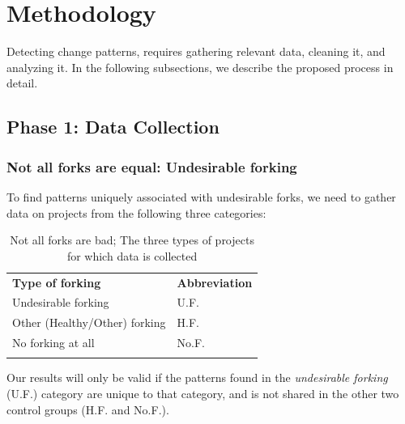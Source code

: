 \documentclass[11pt]{report}
\begin{document}
\section{Methodology}
\label{methodology}

Detecting change patterns, requires gathering  relevant data, cleaning it, and analyzing it. In the following subsections, we describe the proposed process in detail. 

\subsection{Phase 1: Data Collection}

\subsubsection{Not all forks are equal: Undesirable forking}
To find patterns uniquely associated with undesirable forks, we need to gather data on projects from the following three categories: 

\begin{table}[!htbp]
\caption{Not all forks are bad; The three types of projects for which data is collected}
\label{tableUndesirableForkingDataCollect} 
\begin{tabular}{p{} p{}}
\hline\noalign{\smallskip}
\textbf{Type of forking} & \textbf{Abbreviation} \\
\noalign{\smallskip}\hline\noalign{\smallskip}
Undesirable forking & U.F. \\ \hline
Other (Healthy/Other) forking & H.F. \\\hline
No forking at all & No.F. \\
\noalign{\smallskip}\hline
\end{tabular}
\end{table}

Our results will only be valid if the patterns found in the \textit{undesirable forking} (U.F.) category are unique to that category, and is not shared in the other two control groups (H.F. and No.F.).
\end{document}
